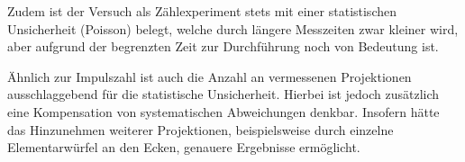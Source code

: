     Zudem ist der Versuch als Zählexperiment stets mit einer statistischen Unsicherheit (Poisson) belegt,
    welche durch längere Messzeiten zwar kleiner wird,
    aber aufgrund der begrenzten Zeit zur Durchführung
    noch von Bedeutung ist.

    Ähnlich zur Impulszahl ist auch die Anzahl an vermessenen Projektionen
    ausschlaggebend für die statistische Unsicherheit.
    Hierbei ist jedoch zusätzlich eine Kompensation von systematischen Abweichungen denkbar.
    Insofern hätte das Hinzunehmen weiterer Projektionen,
    beispielsweise durch einzelne Elementarwürfel an den Ecken,
    genauere Ergebnisse ermöglicht.
